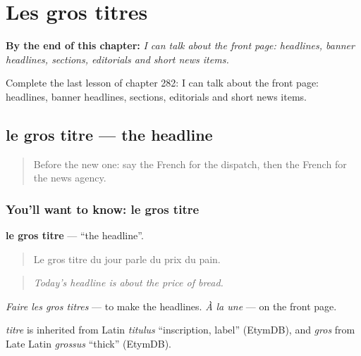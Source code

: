 
\chapter{Les gros titres}
\label{ch:fr-les-gros-titres}

\begin{chapteropening}
\textbf{By the end of this chapter:} \emph{I can talk about the front page: headlines, banner headlines, sections, editorials and short news items.}

Complete the last lesson of chapter 282: I can talk about the front page: headlines, banner headlines, sections, editorials and short news items.
\end{chapteropening}

\section[le gros titre]{le gros titre — the headline}

\label{lesson:FR-C282-gros-titre}



\begin{quote}
Before the new one: say the French for the dispatch, then the French for the news agency.
\end{quote}

\subsection*{You'll want to know: le gros titre}
\textbf{le gros titre} — \textquotedblleft{}the headline\textquotedblright{}.

\begin{quote}
Le gros titre du jour parle du prix du pain.
\end{quote}

\begin{quote}
\emph{Today's headline is about the price of bread.}
\end{quote}

\emph{Faire les gros titres} — to make the headlines. \emph{À la une} — on the front page.

\begin{cousinweb}
\emph{titre} is inherited from Latin \emph{titulus} \textquotedblleft{}inscription, label\textquotedblright{} (EtymDB), and \emph{gros} from Late Latin \emph{grossus} \textquotedblleft{}thick\textquotedblright{} (EtymDB).
\end{cousinweb}

